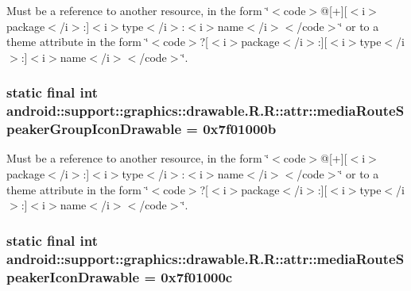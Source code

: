 Must be a reference to another resource, in the form \char`\"{}$<$code$>$@\mbox{[}+\mbox{]}\mbox{[}$<$i$>$package$<$/i$>$:\mbox{]}$<$i$>$type$<$/i$>$:$<$i$>$name$<$/i$>$$<$/code$>$\char`\"{} or to a theme attribute in the form \char`\"{}$<$code$>$?\mbox{[}$<$i$>$package$<$/i$>$:\mbox{]}\mbox{[}$<$i$>$type$<$/i$>$:\mbox{]}$<$i$>$name$<$/i$>$$<$/code$>$\char`\"{}. \hypertarget{classandroid_1_1support_1_1graphics_1_1drawable_1_1_r_1_1attr_8c5aaea70ea1f11730e85bfa220ab428}{
\subsubsection[{mediaRouteSpeakerGroupIconDrawable}]{\setlength{\rightskip}{0pt plus 5cm}static final int android::support::graphics::drawable.R.R::attr::mediaRouteSpeakerGroupIconDrawable = 0x7f01000b}}
\label{classandroid_1_1support_1_1graphics_1_1drawable_1_1_r_1_1attr_8c5aaea70ea1f11730e85bfa220ab428}


Must be a reference to another resource, in the form \char`\"{}$<$code$>$@\mbox{[}+\mbox{]}\mbox{[}$<$i$>$package$<$/i$>$:\mbox{]}$<$i$>$type$<$/i$>$:$<$i$>$name$<$/i$>$$<$/code$>$\char`\"{} or to a theme attribute in the form \char`\"{}$<$code$>$?\mbox{[}$<$i$>$package$<$/i$>$:\mbox{]}\mbox{[}$<$i$>$type$<$/i$>$:\mbox{]}$<$i$>$name$<$/i$>$$<$/code$>$\char`\"{}. \hypertarget{classandroid_1_1support_1_1graphics_1_1drawable_1_1_r_1_1attr_a83a5610225751f658231f4ffe64d399}{
\subsubsection[{mediaRouteSpeakerIconDrawable}]{\setlength{\rightskip}{0pt plus 5cm}static final int android::support::graphics::drawable.R.R::attr::mediaRouteSpeakerIconDrawable = 0x7f01000c}}
\label{classandroid_1_1support_1_1graphics_1_1drawable_1_1_r_1_1attr_a83a5610225751f658231f4ffe64d399}


